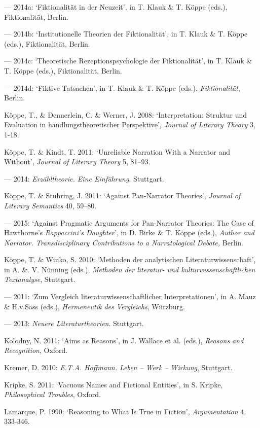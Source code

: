 \begin{hangparas}{.5cm}{1}
--- 2014a: `Fiktionalit\"at in der Neuzeit', in T. Klauk \& T. K\"oppe (eds.), Fiktionalit\"at, Berlin.

--- 2014b: `Institutionelle Theorien der Fiktionalit\"at', in T. Klauk \& T. K\"oppe (eds.), Fiktionalit\"at, Berlin. 

--- 2014c: `Theoretische Rezeptionspsychologie der Fiktionalit\"at', in T. Klauk \& T. K\"oppe (eds.), Fiktionalit\"at, Berlin.

--- 2014d: `Fiktive Tatsachen', in T. Klauk \& T. K\"oppe (eds.), \emph{Fiktionalit\"at}, Berlin.

K\"oppe, T., \& Dennerlein, C. \& Werner, J. 2008: `Interpretation: Struktur und Evaluation in handlungstheoretischer Perspektive', \emph{Journal of Literary Theory} 3, 1-18.

K\"oppe, T. \& Kindt, T. 2011: `Unreliable Narration With a Narrator and Without', \emph{Journal of Literary Theory} 5, 81--93.

--- 2014: \emph{Erz\"ahltheorie. Eine Einf\"uhrung}. Stuttgart.

K\"oppe, T. \& St\"uhring, J. 2011: `Against Pan-Narrator Theories', \emph{Journal of Literary Semantics} 40, 59--80.

--- 2015: `Against Pragmatic Arguments for Pan-Narrator Theories: The Case of Hawthorne's \emph{Rappaccini's Daughter}', in D. Birke \& T. K\"oppe (eds.), \emph{Author and Narrator. Transdisciplinary Contributions to a Narratological Debate,} Berlin.

K\"oppe, T. \& Winko, S. 2010: `Methoden der analytischen Literaturwissenschaft', in A. \&. V. N\"unning (eds.), \emph{Methoden der literatur- und kulturwissenschaftlichen Textanalyse}, Stuttgart.

--- 2011: `Zum Vergleich literaturwissenschaftlicher Interpretationen', in A. Mauz \& H.v.Sass (eds.), \emph{Hermeneutik des Vergleichs}, W\"urzburg.

--- 2013: \emph{Neuere Literaturtheorien}. Stuttgart.

Kolodny, N. 2011: `Aims as Reasons', in J. Wallace et al. (eds.), \emph{Reasons and Recognition}, Oxford.

Kremer, D. 2010: \emph{E.T.A. Hoffmann. Leben -- Werk -- Wirkung}, Stuttgart.

Kripke, S. 2011: `Vacuous Names and Fictional Entities', in S. Kripke, \emph{Philosophical Troubles}, Oxford.

Lamarque, P. 1990: `Reasoning to What Is True in Fiction', \emph{Argumentation} 4, 333-346.


\end{hangparas}
